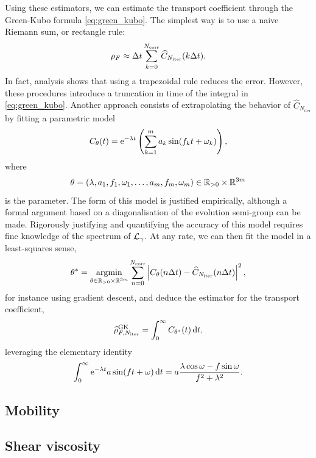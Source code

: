 Using these estimators, we can estimate the transport coefficient through the Green-Kubo formula \eqref{eq:green_kubo}. The simplest way is to use a naive Riemann sum, or rectangle rule:
\[\rho_F \approx {\Delta t}\sum_{k=0}^{N_{\mathrm{corr}}} \widehat{C}_{N_{\mathrm{iter}}}(k{\Delta t}).\]
In fact, analysis shows that using a trapezoidal rule reduces the error.
However, these procedures introduce a truncation in time of the integral in \eqref{eq:green_kubo}.
Another approach consists of extrapolating the behavior of $\widehat{C}_{N_{\mathrm{iter}}}$ by fitting a parametric model 
\begin{equation}
    \label{eq:time_correlation_parametric_model}
    C_{\theta}(t)=\mathrm{e}^{-\lambda t}\left(\sum_{k=1}^{m}a_k\sin(f_k t+\omega_k)\right),
\end{equation}
where \[\theta=(\lambda,a_1,f_1,\omega_1,\dots,a_m,f_m,\omega_m)\in \mathbb{R}_{>0}\times\mathbb{R}^{3m}\]
is the parameter. The form of this model is justified empirically, although a formal argument based on a diagonalisation of the evolution semi-group can be made. 
Rigorously justifying and quantifying the accuracy of this model requires fine knowledge of the spectrum of $\mathcal{L}_\gamma$.
At any rate, we can then fit the model in a least-squares sense,
\begin{equation}
    \theta^*=\underset{\theta\in \mathbb{R}_{>0}\times\mathbb{R}^{3m}}{\mathrm{argmin}}\sum_{n=0}^{N_{\mathrm{corr}}}\left| C_{\theta}(n{\Delta t})-\widehat{C}_{N_{\mathrm{iter}}}(n{\Delta t}) \right|^2,
\end{equation}
for instance using gradient descent, and deduce the estimator for the transport coefficient,
\begin{equation}
    \label{eq:rho_F_estimator_GK_fit}
    \widehat{\rho}^{\mathrm{GK}}_{F,N_{\mathrm{iter}}}=\int_0^\infty C_{\theta^*}(t)\,\mathrm{d} t,
\end{equation}
leveraging the elementary identity
\begin{equation}
    \label{eq:int_analytic_form}
    \int_0^{\infty}\mathrm{e}^{-\lambda t}a\sin(ft+\omega)\,\mathrm{d} t=a\frac{\lambda\cos\omega-f\sin\omega}{f^2+\lambda^2}.
\end{equation}
\subsection{Mobility}
\subsection{Shear viscosity}